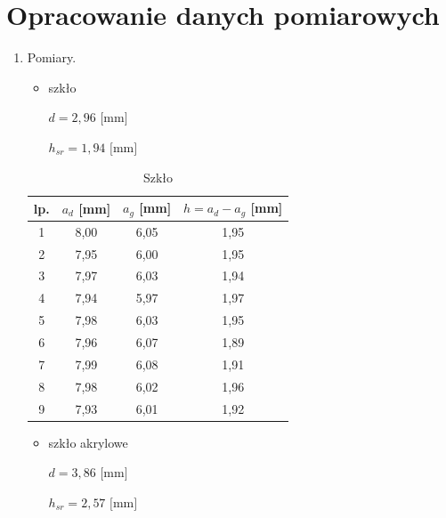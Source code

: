 \documentclass [a4paper,11pt]{article}
\begin{document}
	\section{Opracowanie danych pomiarowych}\label{sec:opr}
	\begin{enumerate}[label=\alph*)]
		
		\item Pomiary.
		
		\begin{itemize}
			\item szkło
			
			$d=2,96 \text{ [mm]}$ 
			
			$h_{sr}=1,94 \text{ [mm]}$ 
		\end{itemize}
		
		\begin{table}[!h]
			\caption{Szkło}
			\label{tab:szklo}
			\begin{center}
				\begin{tabular}{|c|c|c|c|}
					\hline lp. & $a_d$  [mm] & $a_g$ [mm] & $h = a_d - a_g$ [mm]  \\
					\hline 1 & 8,00 & 6,05 & 1,95 \\
					\hline 2 & 7,95 & 6,00 & 1,95 \\
					\hline 3 & 7,97 & 6,03 & 1,94 \\
					\hline 4 & 7,94 & 5,97 & 1,97 \\
					\hline 5 & 7,98 & 6,03 & 1,95 \\
					\hline 6 & 7,96 & 6,07 & 1,89 \\
					\hline 7 & 7,99 & 6,08 & 1,91 \\
					\hline 8 & 7,98 & 6,02 & 1,96 \\
					\hline 9 & 7,93 & 6,01 & 1,92 \\
					\hline 
				\end{tabular} 
			\end{center}
		\end{table}
		\begin{itemize}
			\item szkło akrylowe
			
			$d=3,86 \text{ [mm]}$ 
			
			$h_{sr}=2,57 \text{ [mm]}$
			

\end{itemize}
\end{enumerate}
\end{document}
